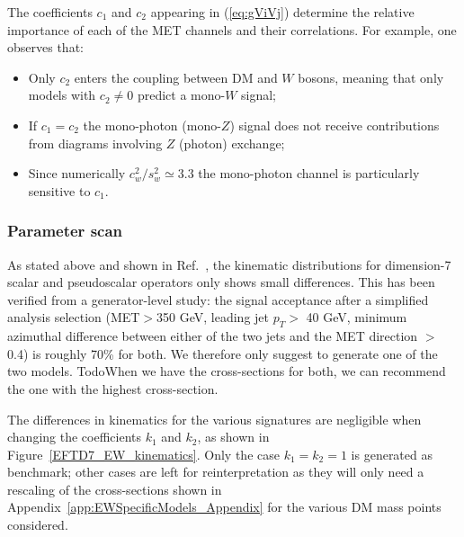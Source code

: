 The coefficients $c_1$ and $c_2$ appearing in (\ref{eq:gViVj}) determine the relative importance of each of the MET channels and their correlations. For example, one observes that:
\begin{itemize}
 \item Only $c_2$ enters the coupling between DM and $W$ bosons, meaning that only models with $c_2 \neq 0$ predict a mono-$W$ signal;
 \item If $c_1 = c_2$ the mono-photon (mono-$Z$) signal does not receive contributions from diagrams involving $Z$ (photon) exchange;
  \item Since numerically $c_w^2/s_w^2 \simeq 3.3$ the mono-photon channel is particularly sensitive to $c_1$.
\end{itemize}

\subsubsection{Parameter scan}

As stated above and shown in Ref.~\cite{Nelson:2013pqa}, 
the kinematic distributions for dimension-7 scalar and pseudoscalar operators
only shows small differences. This has been verified from a generator-level study:
the signal acceptance after a simplified analysis selection 
(MET$>$350 GeV, leading jet $p_T > $ 40 GeV, minimum azimuthal difference between
either of the two jets and the MET direction $>$ 0.4) is roughly 70\% for both. 
We therefore only suggest to generate one of the two models. 
Todo{When we have the cross-sections for both, we can recommend the one with the highest cross-section.}


The differences in kinematics for the various signatures
are negligible when changing the coefficients $k_1$ and $k_2$, as shown
in Figure~\ref{EFTD7_EW_kinematics}. Only the case $k_1=k_2=1$ is generated as benchmark;
other cases are left for reinterpretation as they will only need a rescaling of the cross-sections
shown in Appendix~\ref{app:EWSpecificModels_Appendix} for the various DM
mass points considered.


